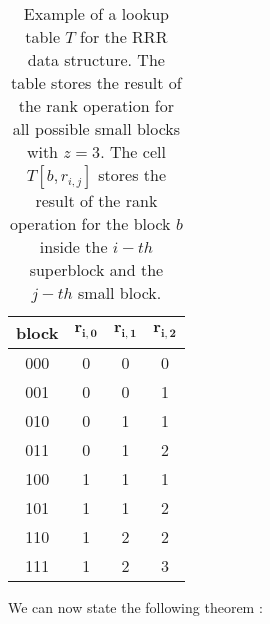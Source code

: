 \begin{table}[h]
    \centering
    \begin{tabular}{|c|c|c|c|}
        \hline
        \textbf{block} & $\mathbf{r_{i,0}}$ & $\mathbf{r_{i,1}}$ & $\mathbf{r_{i,2}}$ \\
        \hline
        000            & 0                  & 0                  & 0                  \\
        001            & 0                  & 0                  & 1                  \\
        010            & 0                  & 1                  & 1                  \\
        011            & 0                  & 1                  & 2                  \\
        100            & 1                  & 1                  & 1                  \\
        101            & 1                  & 1                  & 2                  \\
        110            & 1                  & 2                  & 2                  \\
        111            & 1                  & 2                  & 3                  \\
        \hline
    \end{tabular}
    \caption{Example of a lookup table $T$ for the RRR data structure. The table stores the result of the rank operation for all possible small blocks with $z = 3$. The cell $T[b, r_{i,j}]$ stores the result of the rank operation for the block $b$ inside the $i-th$ superblock and the $j-th$ small block.} \label{tab:lookup}
\end{table}

\noindent We can now state the following theorem \cite{ferragina2023pearls}:


